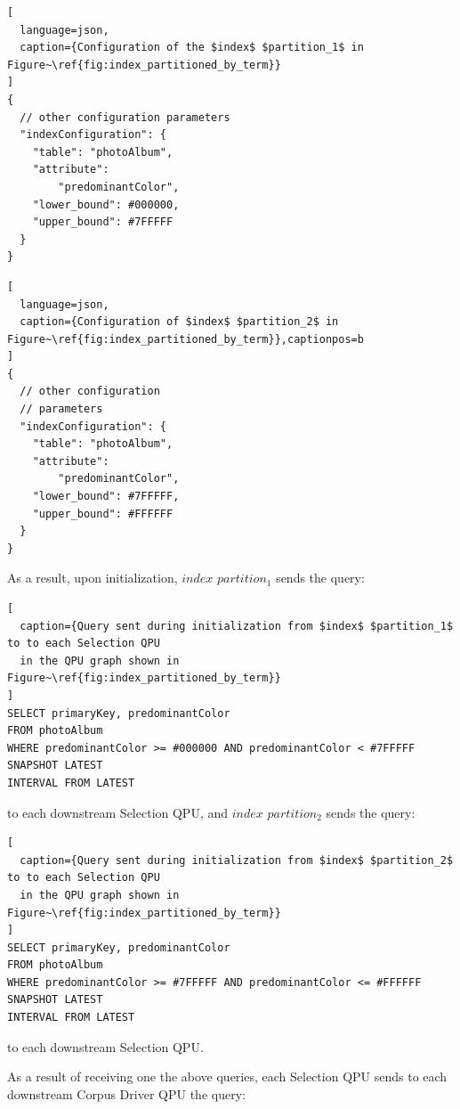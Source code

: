 \begin{minipage}{.45\textwidth}
\begin{lstlisting}[
  language=json,
  caption={Configuration of the $index$ $partition_1$ in Figure~\ref{fig:index_partitioned_by_term}}
]
{
  // other configuration parameters
  "indexConfiguration": {
    "table": "photoAlbum",
    "attribute":
        "predominantColor",
    "lower_bound": #000000,
    "upper_bound": #7FFFFF
  }
}
\end{lstlisting}
\end{minipage}\hfill
\begin{minipage}{.45\textwidth}
\begin{lstlisting}[
  language=json,
  caption={Configuration of $index$ $partition_2$ in Figure~\ref{fig:index_partitioned_by_term}},captionpos=b
]
{
  // other configuration
  // parameters
  "indexConfiguration": {
    "table": "photoAlbum",
    "attribute":
        "predominantColor",
    "lower_bound": #7FFFFF,
    "upper_bound": #FFFFFF
  }
}
\end{lstlisting}
\end{minipage}

\medskip
\noindent
As a result, upon initialization, $index$ $partition_1$ sends the query: 

\begin{lstlisting}[
  caption={Query sent during initialization from $index$ $partition_1$ to to each Selection QPU
  in the QPU graph shown in Figure~\ref{fig:index_partitioned_by_term}}
]
SELECT primaryKey, predominantColor
FROM photoAlbum
WHERE predominantColor >= #000000 AND predominantColor < #7FFFFF
SNAPSHOT LATEST
INTERVAL FROM LATEST
\end{lstlisting}

\noindent
to each downstream Selection QPU, and $index$ $partition_2$ sends the query: 

\begin{lstlisting}[
  caption={Query sent during initialization from $index$ $partition_2$ to to each Selection QPU
  in the QPU graph shown in Figure~\ref{fig:index_partitioned_by_term}}
]
SELECT primaryKey, predominantColor
FROM photoAlbum
WHERE predominantColor >= #7FFFFF AND predominantColor <= #FFFFFF
SNAPSHOT LATEST
INTERVAL FROM LATEST
\end{lstlisting}

\noindent
to each downstream Selection QPU.

\noindent
As a result of receiving one the above queries,
each Selection QPU sends to each downstream Corpus Driver QPU the query:

